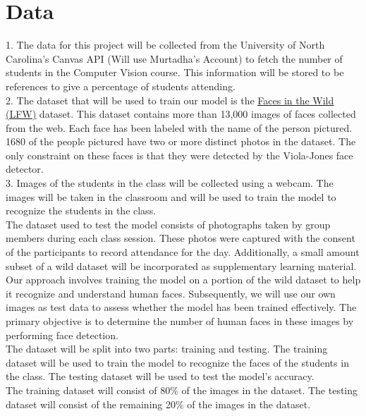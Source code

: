 \section{Data}
1. The data for this project will be collected from the University of North Carolina's Canvas API (Will use Murtadha's Account) to fetch the number of students in the Computer Vision course. This information will be stored to be references to give a percentage of students attending.\\
2. The dataset that will be used to train our model is the \href{http://vis-www.cs.umass.edu/lfw/}{\underline{Faces in the Wild (LFW)}} dataset. This dataset contains more than 13,000 images of faces collected from the web. Each face has been labeled with the name of the person pictured. 1680 of the people pictured have two or more distinct photos in the dataset. The only constraint on these faces is that they were detected by the Viola{-}Jones face detector.\\
3. Images of the students in the class will be collected using a webcam. The images will be taken in the classroom and will be used to train the model to recognize the students in the class.\\
The dataset used to test the model consists of photographs taken by group members during each class session. These photos were captured with the consent of the participants to record attendance for the day. Additionally, a small amount subset of a wild dataset will be incorporated as supplementary learning material.\\
Our approach involves training the model on a portion of the wild dataset to help it recognize and understand human faces. Subsequently, we will use our own images as test data to assess whether the model has been trained effectively. The primary objective is to determine the number of human faces in these images by performing face detection.\\
The dataset will be split into two parts: training and testing. The training dataset will be used to train the model to recognize the faces of the students in the class. The testing dataset will be used to test the model's accuracy.\\
The training dataset will consist of 80\% of the images in the dataset. The testing dataset will consist of the remaining 20\% of the images in the dataset.\\



